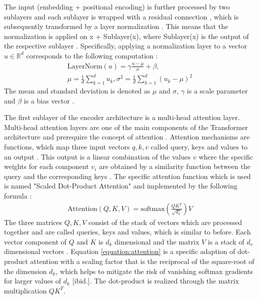 \par
The input (embedding + positional encoding) is further processed by two sublayers and each sublayer is wrapped with a residual connection \citep{He2016}, which is subsequently transformed by a layer normalization \citep{Ba2016}.
This means that the normalization is applied on x + Sublayer(x), where Sublayer(x) is the output of the respective sublayer \citep{Vaswani2017}.
Specifically, applying a normalization layer to a vector $u\in \mathbb{R}^d$ corresponds to the following computation \citep{Ba2016,Xiong2020}:
\begin{align}
	\text{LayerNorm}(u) = \gamma \frac{u-\mu}{\sigma}+\beta,\\
	\mu = \frac{1}{d}\sum_{k=1}^{d}u_k, \sigma^2 = \frac{1}{d}\sum_{k=1}^{d}(u_k - \mu)^2
\end{align}
The mean and standard deviation is denoted as $\mu$ and $\sigma$, $\gamma$ is a scale parameter and $\beta$ is a bias vector \citep{Xiong2020}.
\par
The first sublayer of the encoder architecture is a multi-head attention layer.   
Multi-head attention layers are one of the main components of the Transformer architecture and prerequire the concept of attention \citep{Vaswani2017}.
Attention mechanisms are functions, which map three input vectors $q,k,v$ called query, keys and values to an output \citep{Vaswani2017}.
This output is a linear combination of the values $v$ where the specific weights for each component $v_i$ are obtained by a similarity function between the query and the corresponding keys \citep{Vaswani2017}.
The specific attention function which is used is named "Scaled Dot-Product Attention" and implemented by the following formula \citep{Vaswani2017}:
\begin{align}
    \text{Attention}(Q,K,V) = \text{softmax}(\frac{QK^T}{\sqrt{d_k}})V
	\label{equation:attention}
\end{align}
The three matrices $Q,K,V$ consist of the stack of vectors which are processed together and are called queries, keys and values, which is similar to before.
Each vector component of $Q$ and $K$ is $d_k$ dimensional and the matrix $V$ is a stack of $d_v$ dimensional vectors \citep{Vaswani2017}.
Equation \ref{equation:attention} is a specific adaption of dot-product attention with a scaling factor that is the reciprocal of the square-root of the dimension $d_k$, which helps to mitigate the risk of vanishing softmax gradients for larger values of $d_k$ [ibid.].
The dot-product is realized through the matrix multiplication $QK^T$.

